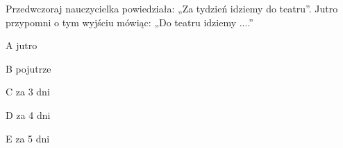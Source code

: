 \begin{tresc}
Przedwczoraj nauczycielka powiedziała: „Za tydzień idziemy do teatru”. Jutro przypomni o tym wyjściu mówiąc: „Do teatru idziemy ....”
\end{tresc}
\begin{wariant}{A} jutro \end{wariant}
\begin{wariant}{B} pojutrze \end{wariant}
\begin{wariant}{C} za 3 dni \end{wariant}
\begin{wariant}{D} za 4 dni \end{wariant}
\begin{wariant}{E} za 5 dni \end{wariant}
